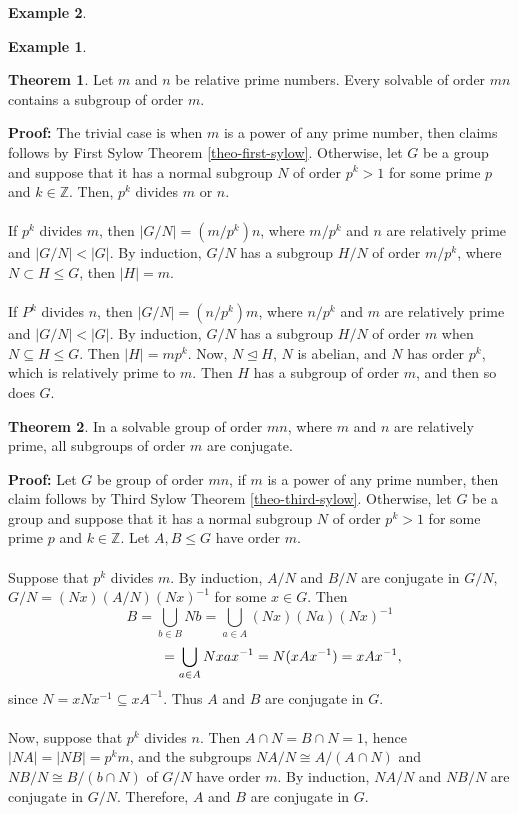\documentclass[11pt]{amsbook}%
\theoremstyle{plain}
\theoremstyle{definition}
\newtheorem*{example*}{Example}
\newtheorem{theorem}{Theorem}
\numberwithin{equation}{section}
\newcommand{\ZZ}{\mathbb Z}
\renewcommand{\proof}{ \textbf{Proof: }}
\newcommand{\leftnormal}{\trianglelefteq}
\begin{document}
\begin{example*}
\begin{example*}
\begin{theorem}
  \label{theo-first-hall}
  Let $m$ and $n$ be relative prime numbers. Every solvable of order $mn$ contains
  a subgroup of order $m$.
\end{theorem} \vspace{1.8em}
\proof The trivial case is when $m$ is a power of any prime number, then claims follows by First Sylow Theorem \ref{theo-first-sylow}.
Otherwise, let $G$ be a group and suppose that it has a normal subgroup $N$ of order $p^{k} > 1$ for some prime $p$ and $k \in \ZZ$.
Then, $p^{k}$ divides $m$ or $n$. \\ \\
If $p^{k}$ divides $m$, then $|G/N| = (m/p^{k})n$, where $m/p^{k}$ and $n$ are relatively prime and $|G/N| < |G|$. By induction,
$G/N$ has a subgroup $H/N$ of order $m/p^{k}$, where $N \subset H \leq G$, then $|H| = m$. \\ \\
If $P^{k}$ divides $n$, then $|G/N| = (n/p^{k})m$, where $n/p^{k}$ and $m$ are relatively prime and $|G/N| < |G|$. By induction,
$G/N$ has a subgroup $H/N$ of order $m$ when $N \subseteq H \leq G$. Then $|H| = mp^{k}$. Now, $N \leftnormal H$,
$N$ is abelian, and $N$ has order $p^{k}$, which is relatively prime to $m$. Then $H$ has a subgroup of order $m$,
and then so does $G$. \qedsymbol

\begin{theorem}
  \label{theo-second-hall}
  In a solvable group of order $mn$, where $m$ and $n$ are relatively prime, all subgroups of order $m$ are conjugate.
\end{theorem} \vspace{1.8em}
\proof Let $G$ be group of order $mn$, if $m$ is a power of any prime number, then claim follows by Third Sylow Theorem \ref{theo-third-sylow}.
Otherwise, let $G$ be a group and suppose that it has a normal subgroup $N$ of order $p^{k} > 1$ for some prime $p$ and $k \in \ZZ$.
Let $A, B \leq G$ have order $m$. \\ \\
Suppose that $p^{k}$ divides $m$. By induction, $A/N$ and $B/N$ are conjugate in $G/N$, $G/N = (Nx)(A/N)(Nx)^{-1}$ for some $x \in G$. Then
$$
B = \bigcup_{b \in B} Nb = \bigcup_{a \in A}(Nx)(Na)(Nx)^{-1}
$$
$$
\hspace{3.3em} = \bigcup_{a \in A}Nxax^{-1} = N(xAx^{-1}) = xAx^{-1},
$$
since $N = xNx^{-1} \subseteq xA^{-1}$. Thus $A$ and $B$ are conjugate in $G$. \\ \\
Now, suppose that $p^{k}$ divides $n$. Then $A \cap N = B \cap N = 1$, hence $|NA| = |NB| = p^{k}m$,
and the subgroups $NA/N \cong A/(A \cap N)$ and $NB/N \cong B/(b \cap N)$ of $G/N$ have order $m$.
By induction, $NA/N$ and $NB/N$ are conjugate in $G/N$. Therefore, $A$ and $B$ are conjugate in $G$. \qedsymbol


\end{example*}
\end{example*}
\end{document}

